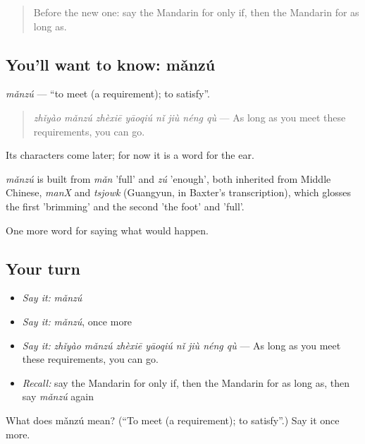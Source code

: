 \label{lesson:ZH-C399-manzu}



\begin{quote}
Before the new one: say the Mandarin for only if, then the Mandarin for as long as.
\end{quote}

\subsection*{You'll want to know: mǎnzú}
\emph{mǎnzú} — \textquotedblleft{}to meet (a requirement); to satisfy\textquotedblright{}.

\begin{quote}
\emph{zhǐyào mǎnzú zhèxiē yāoqiú nǐ jiù néng qù} — As long as you meet these requirements, you can go.
\end{quote}

Its characters come later; for now it is a word for the ear.

\begin{cousinweb}
\emph{mǎnzú} is built from \emph{mǎn} 'full' and \emph{zú} 'enough', both inherited from Middle Chinese, \emph{manX} and \emph{tsjowk} (Guangyun, in Baxter's transcription), which glosses the first 'brimming' and the second 'the foot' and 'full'.
\end{cousinweb}

\begin{grammarlens}[title={What you've built}]
One more word for saying what would happen.
\end{grammarlens}

\subsection*{Your turn}
\begin{itemize}
\raggedright
  \item \emph{Say it:} \emph{mǎnzú}
  \item \emph{Say it:} \emph{mǎnzú}, once more
  \item \emph{Say it:} \emph{zhǐyào mǎnzú zhèxiē yāoqiú nǐ jiù néng qù} — As long as you meet these requirements, you can go.
  \item \emph{Recall:} say the Mandarin for only if, then the Mandarin for as long as, then say \emph{mǎnzú} again
\end{itemize}

\begin{tcolorbox}[breakable,colback=teal!4,colframe=teal!35!black,title={Before you move on}]
What does mǎnzú mean? (\textquotedblleft{}To meet (a requirement); to satisfy\textquotedblright{}.) Say it once more.
\end{tcolorbox}
